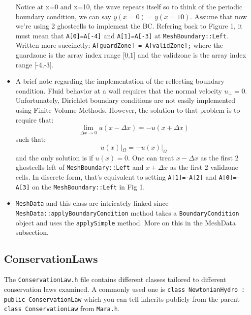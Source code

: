 \documentclass{article}
\begin{document}
\begin{itemize}
	Notice at x=0 and x=10, the wave repeats itself so to think of the periodic boundary condition, we can say $y(x=0)=y(x=10)$. Assume that now we're using 2 ghostcells to implement the BC. Refering back to Figure 1, it must mean that \texttt{A[0]=A[-4]} and \texttt{A[1]=A[-3]} at \texttt{MeshBoundary::Left}. Written more succinctly: \texttt{A[guardZone] = A[validZone];} where the guardzone is the array index range [0,1] and the validzone is the array index range [-4,-3]. 
	
	\item A brief note regarding the implementation of the reflecting boundary condition. Fluid behavior at a wall requires that the normal velocity $u_\perp=0$. Unfortunately, Dirichlet boundary conditions are not easily implemented using Finite-Volume Methods. However, the solution to that problem is to require that:
	$$\lim_{\Delta x \rightarrow 0}u(x-\Delta x) = -u(x+\Delta x) $$
	such that: 
	$$ u(x)|_{\Omega} = -u(x)|_{\Omega}$$ and the only solution is if $u(x) = 0$. One can treat $x-\Delta x$ as the first 2 ghostcells left of \texttt{MeshBoundary::Left} and $x+\Delta x$ as the first 2 validzone cells. In discrete form, that's equivalent to setting \texttt{A[1]=-A[2]} and \texttt{A[0]=-A[3]} on the \texttt{MeshBoundary::Left} in Fig 1.
		
	\item \texttt{MeshData} and this class are intricately linked since \texttt{MeshData::applyBoundaryCondition} method takes a \texttt{BoundaryCondition} object and uses the \texttt{applySimple} method. More on this in the MeshData subsection.
	
	
\end{itemize}

\subsection{ConservationLaws}
The \texttt{ConservationLaw.h} file contains different classes tailored to different conservation laws examined. A commonly used one is \texttt{class NewtonianHydro : public ConservationLaw} which you can tell inherits publicly from the parent \texttt{class ConservationLaw} from \texttt{Mara.h}. 
\end{document}
